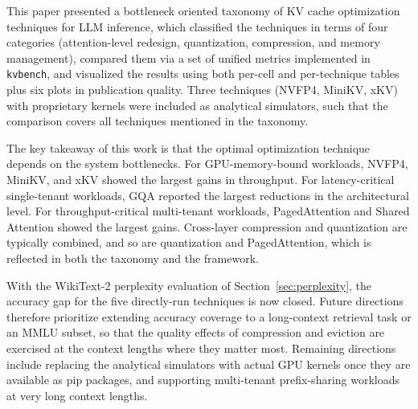 \documentclass[conference]{IEEEtran}
\begin{document}
This paper presented a bottleneck oriented taxonomy of KV cache optimization techniques for LLM inference, which classified the techniques in terms of four categories (attention-level redesign, quantization, compression, and memory management), compared them via a set of unified metrics implemented in \texttt{kvbench}, and visualized the results using both per-cell and per-technique tables plus six plots in publication quality. Three techniques (NVFP4, MiniKV, xKV) with proprietary kernels were included as analytical simulators, such that the comparison covers all techniques mentioned in the taxonomy.

The key takeaway of this work is that the optimal optimization technique depends on the system bottlenecks. For GPU-memory-bound workloads, NVFP4, MiniKV, and xKV showed the largest gains in throughput. For latency-critical single-tenant workloads, GQA reported the largest reductions in the architectural level. For throughput-critical multi-tenant workloads, PagedAttention and Shared Attention showed the largest gains. Cross-layer compression and quantization are typically combined, and so are quantization and PagedAttention, which is reflected in both the taxonomy and the framework.

With the WikiText-2 perplexity evaluation of Section~\ref{sec:perplexity}, the accuracy gap for the five directly-run techniques is now closed. Future directions therefore prioritize extending accuracy coverage to a long-context retrieval task or an MMLU subset, so that the quality effects of compression and eviction are exercised at the context lengths where they matter most. Remaining directions include replacing the analytical simulators with actual GPU kernels once they are available as pip packages, and supporting multi-tenant prefix-sharing workloads at very long context lengths.




\end{document}
